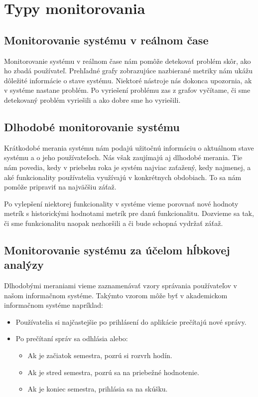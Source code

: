 \documentclass[a4paper, usesections, upjsfrontpage, thesismargins, thesislinespacing]{rnthesis}
\begin{document}
\newpage

\section{Typy monitorovania}

\subsection{Monitorovanie systému v reálnom čase}

Monitorovanie systému v reálnom čase nám pomôže detekovať problém skôr, ako ho zbadá používateľ.
Prehľadné grafy zobrazujúce nazbierané metriky nám ukážu dôležité informácie o stave systému.
Niektoré nástroje nás dokonca upozornia, ak v systéme nastane problém.
Po vyriešení problému zas z grafov vyčítame, či sme detekovaný problém vyriešili a ako dobre sme ho vyriešili.

\subsection{Dlhodobé monitorovanie systému}

Krátkodobé merania systému nám podajú užitočnú informáciu o aktuálnom stave systému a o jeho používateľoch.
Nás však zaujímajú aj dlhodobé merania.
Tie nám povedia, kedy v priebehu roka je systém najviac zaťažený, kedy najmenej, a aké funkcionality používatelia využívajú v konkrétnych obdobiach.
To sa nám pomôže pripraviť na najväčšiu záťaž.

Po vylepšení niektorej funkcionality v systéme vieme porovnať nové hodnoty metrík s historickými hodnotami metrík pre danú funkcionalitu.
Dozvieme sa tak, či sme funkcionalitu naopak nezhoršili a či bude schopná vydržať záťaž.

\subsection{Monitorovanie systému za účelom hĺbkovej analýzy}

Dlhodobými meraniami vieme zaznamenávať vzory správania používateľov v našom informačnom systéme.
Takýmto vzorom môže byť v akademickom informačnom systéme napríklad:

\begin{itemize}
	\item Používatelia si najčastejšie po prihlásení do aplikácie prečítajú nové správy.
	\item Po prečítaní správ sa odhlásia alebo:
	\begin{itemize}
		\item Ak je začiatok semestra, pozrú si rozvrh hodín.
		\item Ak je stred semestra, pozrú sa na priebežné hodnotenie.
		\item Ak je koniec semestra, prihlásia sa na skúšku.
	\end{itemize}
\end{itemize}
\end{document}
